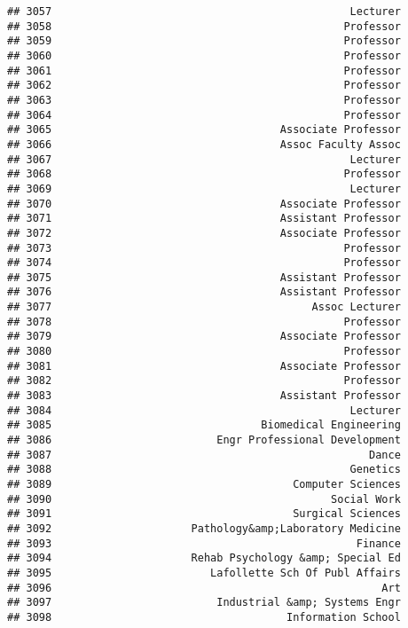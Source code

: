\documentclass[
]{article}
\begin{document}
\begin{verbatim}
## 3057                                               Lecturer
## 3058                                              Professor
## 3059                                              Professor
## 3060                                              Professor
## 3061                                              Professor
## 3062                                              Professor
## 3063                                              Professor
## 3064                                              Professor
## 3065                                    Associate Professor
## 3066                                    Assoc Faculty Assoc
## 3067                                               Lecturer
## 3068                                              Professor
## 3069                                               Lecturer
## 3070                                    Associate Professor
## 3071                                    Assistant Professor
## 3072                                    Associate Professor
## 3073                                              Professor
## 3074                                              Professor
## 3075                                    Assistant Professor
## 3076                                    Assistant Professor
## 3077                                         Assoc Lecturer
## 3078                                              Professor
## 3079                                    Associate Professor
## 3080                                              Professor
## 3081                                    Associate Professor
## 3082                                              Professor
## 3083                                    Assistant Professor
## 3084                                               Lecturer
## 3085                                 Biomedical Engineering
## 3086                          Engr Professional Development
## 3087                                                  Dance
## 3088                                               Genetics
## 3089                                      Computer Sciences
## 3090                                            Social Work
## 3091                                      Surgical Sciences
## 3092                      Pathology&amp;Laboratory Medicine
## 3093                                                Finance
## 3094                      Rehab Psychology &amp; Special Ed
## 3095                         Lafollette Sch Of Publ Affairs
## 3096                                                    Art
## 3097                          Industrial &amp; Systems Engr
## 3098                                     Information School

\end{verbatim}
\end{document}
